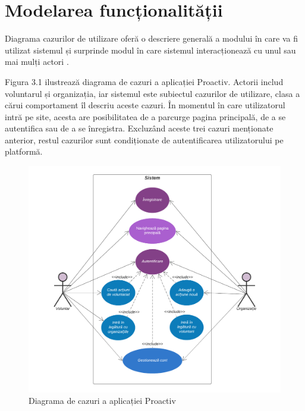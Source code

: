 \documentclass[12pt,a4paper]{report}
\begin{document}
\section{Modelarea funcționalității}
\par
Diagrama cazurilor de utilizare oferă o descriere generală a modului în care va fi utilizat sistemul și surprinde modul în care sistemul interacționează cu unul sau mai mulți actori \cite{usecases}.
\\
\par
Figura 3.1 ilustrează diagrama de cazuri a aplicației Proactiv. Actorii includ voluntarul și organizația, iar sistemul este subiectul cazurilor de utilizare, clasa a cărui comportament îl descriu aceste cazuri. 
În momentul în care utilizatorul intră pe site, acesta are posibilitatea de a parcurge pagina principală, de a se autentifica sau de a se înregistra. Excluzând aceste trei cazuri menționate anterior, restul cazurilor sunt condiționate de autentificarea utilizatorului pe platformă.
\\
\begin{figure}[h!]
  \centering
    \includegraphics[width=0.7\linewidth]{./imagini/UseCase.png}
    \caption{Diagrama de cazuri a aplicației Proactiv}
\end{figure}
\end{document}
